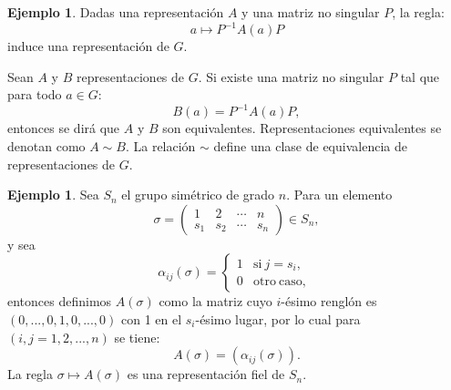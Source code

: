 \documentclass[12pt]{book}
\theoremstyle{definition}
\newtheorem{example}[theorem]{Ejemplo}
\newcounter{in}
\newcounter{ini}
\begin{document}
\begin{example}
  \label{Ej5}
  Dadas una representación $A$ y una matriz no singular $P$, la regla:
  \begin{equation*}
    a \mapsto P^{-1}A\left(a\right)P
  \end{equation*}  
  induce una representación de $G$.

  Sean $A$ y $B$ representaciones de $G$. Si existe una
  matriz no singular $P$ tal que para todo $a \in G$:
  \begin{equation*}
    B\left(a\right)= P^{-1}A\left(a\right)P,
  \end{equation*}
  entonces se dirá que $A$ y $B$ son equivalentes. Representaciones
  equivalentes se denotan como $A \sim B$. La relación $\sim$ define
  una clase de equivalencia de representaciones de $G$.
\end{example}

\begin{example}
  \label{Ej3}
  Sea $S_{n}$ el grupo simétrico de grado
  $n$. Para un elemento
  \begin{equation}
    \label{eq:1}
    \sigma =
    \begin{pmatrix}
      1 & 2 & \cdots  & n\\
      s_{1} & s_{2} & \cdots & s_{n}
    \end{pmatrix} 
    \in S_{n},
  \end{equation}
  y sea
  \begin{equation*}
    \alpha_{ij}\left(\sigma\right) = \left\{
      \begin{array}{ll}
        1      & \mathrm{si\ } j = s_{i}, \\
        0      & \mathrm{otro\ caso,\ } 
      \end{array}
    \right.
  \end{equation*}
  entonces definimos $A\left(\sigma\right)$ como la matriz cuyo
  $i$-ésimo renglón es $\left(0,...,0,1,0,...,0\right)$ con 1 en el
  $s_{i}$-ésimo lugar, por lo cual para $\left(i,j=1,2,...,n\right)$
  se tiene:
  \begin{equation*}
    A\left(\sigma\right) = \left(\alpha_{ij}\left(\sigma\right)\right).
  \end{equation*}
  La regla $\sigma \mapsto A\left(\sigma\right)$ es una representación
  fiel de $S_{n}$.
\end{example}
\end{document}

